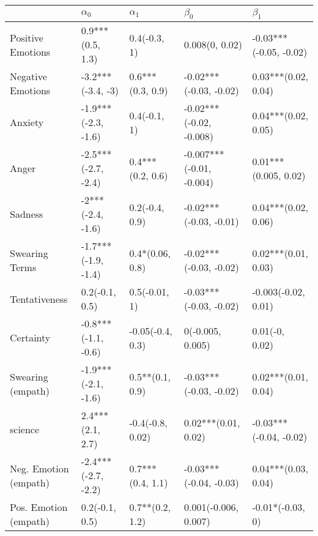 \begin{tabular}{lllll}
\toprule
{} &           $\alpha_0$ &        $\alpha_1$ &                 $\beta_0$ &               $\beta_1$ \\
\midrule
Positive Emotions     &     0.9***(0.5, 1.3) &      0.4(-0.3, 1) &            0.008(0, 0.02) &  -0.03***(-0.05, -0.02) \\
Negative Emotions     &    -3.2***(-3.4, -3) &  0.6***(0.3, 0.9) &    -0.02***(-0.03, -0.02) &     0.03***(0.02, 0.04) \\
Anxiety               &  -1.9***(-2.3, -1.6) &      0.4(-0.1, 1) &   -0.02***(-0.02, -0.008) &     0.04***(0.02, 0.05) \\
Anger                 &  -2.5***(-2.7, -2.4) &  0.4***(0.2, 0.6) &  -0.007***(-0.01, -0.004) &    0.01***(0.005, 0.02) \\
Sadness               &    -2***(-2.4, -1.6) &    0.2(-0.4, 0.9) &    -0.02***(-0.03, -0.01) &     0.04***(0.02, 0.06) \\
Swearing Terms        &  -1.7***(-1.9, -1.4) &   0.4*(0.06, 0.8) &    -0.02***(-0.03, -0.02) &     0.02***(0.01, 0.03) \\
Tentativeness         &       0.2(-0.1, 0.5) &     0.5(-0.01, 1) &    -0.03***(-0.03, -0.02) &     -0.003(-0.02, 0.01) \\
Certainty             &  -0.8***(-1.1, -0.6) &  -0.05(-0.4, 0.3) &          0(-0.005, 0.005) &          0.01(-0, 0.02) \\
Swearing (empath)     &  -1.9***(-2.1, -1.6) &   0.5**(0.1, 0.9) &    -0.03***(-0.03, -0.02) &     0.02***(0.01, 0.04) \\
science               &     2.4***(2.1, 2.7) &  -0.4(-0.8, 0.02) &       0.02***(0.01, 0.02) &  -0.03***(-0.04, -0.02) \\
Neg. Emotion (empath) &  -2.4***(-2.7, -2.2) &  0.7***(0.4, 1.1) &    -0.03***(-0.04, -0.03) &     0.04***(0.03, 0.04) \\
Pos. Emotion (empath) &       0.2(-0.1, 0.5) &   0.7**(0.2, 1.2) &      0.001(-0.006, 0.007) &        -0.01*(-0.03, 0) \\
\bottomrule
\end{tabular}

